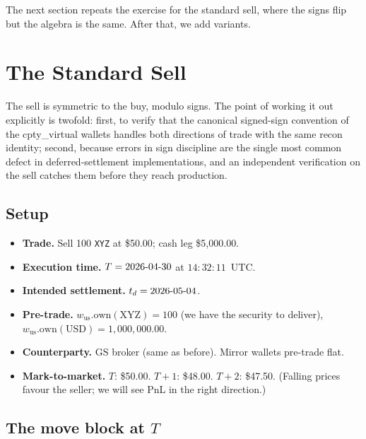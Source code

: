 \documentclass[11pt,a4paper]{article}
\begin{document}
The next section repeats the exercise for the standard sell, where the signs flip but the algebra is the same. After that, we add variants.

\clearpage
\section{The Standard Sell}
\label{sec:standard-sell}

The sell is symmetric to the buy, modulo signs. The point of working it out explicitly is twofold: first, to verify that the canonical signed-sign convention of the cpty\_virtual wallets handles both directions of trade with the same recon identity; second, because errors in sign discipline are the single most common defect in deferred-settlement implementations, and an independent verification on the sell catches them before they reach production.

\subsection{Setup}

\begin{itemize}[nosep]
\item \textbf{Trade.} Sell 100 \texttt{XYZ} at \$50.00; cash leg \$5{,}000.00.
\item \textbf{Execution time.} $T = 2026\textnormal{-}04\textnormal{-}30$ at $14{:}32{:}11$~UTC.
\item \textbf{Intended settlement.} $t_d = 2026\textnormal{-}05\textnormal{-}04$.
\item \textbf{Pre-trade.} $w_{\mathrm{us}}.\mathrm{own}(\mathrm{XYZ}) = 100$ (we have the security to deliver), $w_{\mathrm{us}}.\mathrm{own}(\mathrm{USD}) = 1{,}000{,}000.00$.
\item \textbf{Counterparty.} $\mathrm{GS}$ broker (same as before). Mirror wallets pre-trade flat.
\item \textbf{Mark-to-market.} $T$: \$50.00. $T+1$: \$48.00. $T+2$: \$47.50. (Falling prices favour the seller; we will see PnL in the right direction.)
\end{itemize}

\subsection{The move block at $T$}
\end{document}

